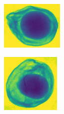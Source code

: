 \documentclass[11pt]{article}
\begin{document}
\begin{figure}[!h]
\begin{subfigure}[b]{0.18\textwidth}
         \caption{}
         \label{fig:data_avo_clip_2}
     \end{subfigure}
     \hfill
     \begin{subfigure}[b]{0.18\textwidth}
         \centering
         \includegraphics[width=\textwidth]{figurer/data/avo0-part2.jpg}
         \caption{}
         \label{fig:data_avo_clip_3}
     \end{subfigure}
         \hfill
     \begin{subfigure}[b]{0.18\textwidth}
         \centering
         \includegraphics[width=\textwidth]{figurer/data/avo0-part3.jpg}

\end{subfigure}
\end{figure}
\end{document}
